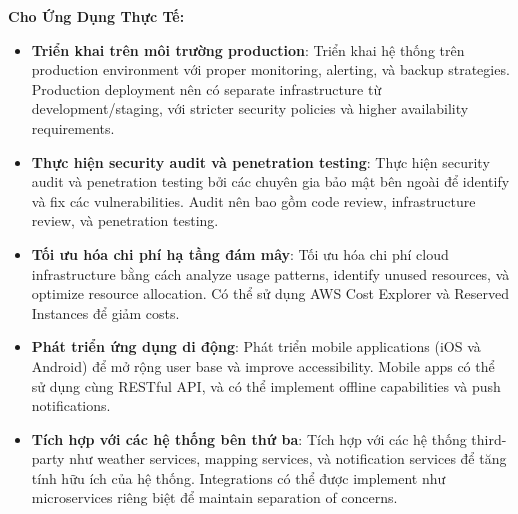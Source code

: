\textbf{Cho Ứng Dụng Thực Tế:}
\begin{itemize}
    \item \textbf{Triển khai trên môi trường production}: Triển khai hệ thống trên production environment với proper monitoring, alerting, và backup strategies. Production deployment nên có separate infrastructure từ development/staging, với stricter security policies và higher availability requirements.
    
    \item \textbf{Thực hiện security audit và penetration testing}: Thực hiện security audit và penetration testing bởi các chuyên gia bảo mật bên ngoài để identify và fix các vulnerabilities. Audit nên bao gồm code review, infrastructure review, và penetration testing.
    
    \item \textbf{Tối ưu hóa chi phí hạ tầng đám mây}: Tối ưu hóa chi phí cloud infrastructure bằng cách analyze usage patterns, identify unused resources, và optimize resource allocation. Có thể sử dụng AWS Cost Explorer và Reserved Instances để giảm costs.
    
    \item \textbf{Phát triển ứng dụng di động}: Phát triển mobile applications (iOS và Android) để mở rộng user base và improve accessibility. Mobile apps có thể sử dụng cùng RESTful API, và có thể implement offline capabilities và push notifications.
    
    \item \textbf{Tích hợp với các hệ thống bên thứ ba}: Tích hợp với các hệ thống third-party như weather services, mapping services, và notification services để tăng tính hữu ích của hệ thống. Integrations có thể được implement như microservices riêng biệt để maintain separation of concerns.
\end{itemize}

